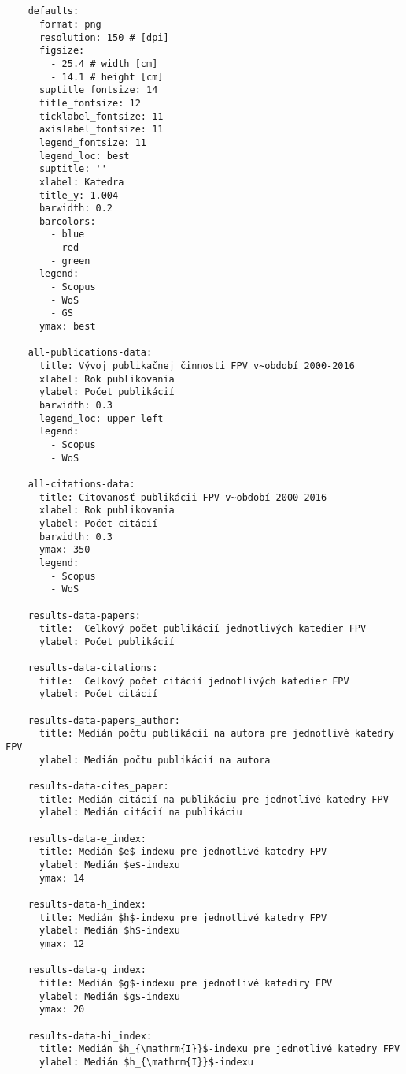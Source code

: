 \begin{source}
  \begin{verbatim}


    defaults:
      format: png
      resolution: 150 # [dpi]
      figsize:
        - 25.4 # width [cm]
        - 14.1 # height [cm]
      suptitle_fontsize: 14
      title_fontsize: 12
      ticklabel_fontsize: 11
      axislabel_fontsize: 11
      legend_fontsize: 11
      legend_loc: best
      suptitle: ''
      xlabel: Katedra
      title_y: 1.004
      barwidth: 0.2
      barcolors:
        - blue
        - red
        - green
      legend:
        - Scopus
        - WoS
        - GS
      ymax: best

    all-publications-data:
      title: Vývoj publikačnej činnosti FPV v~období 2000-2016
      xlabel: Rok publikovania
      ylabel: Počet publikácií
      barwidth: 0.3
      legend_loc: upper left
      legend:
        - Scopus
        - WoS

    all-citations-data:
      title: Citovanosť publikácii FPV v~období 2000-2016
      xlabel: Rok publikovania
      ylabel: Počet citácií
      barwidth: 0.3
      ymax: 350
      legend:
        - Scopus
        - WoS

    results-data-papers:
      title:  Celkový počet publikácií jednotlivých katedier FPV
      ylabel: Počet publikácií

    results-data-citations:
      title:  Celkový počet citácií jednotlivých katedier FPV
      ylabel: Počet citácií

    results-data-papers_author:
      title: Medián počtu publikácií na autora pre jednotlivé katedry FPV
      ylabel: Medián počtu publikácií na autora

    results-data-cites_paper:
      title: Medián citácií na publikáciu pre jednotlivé katedry FPV
      ylabel: Medián citácií na publikáciu

    results-data-e_index:
      title: Medián $e$-indexu pre jednotlivé katedry FPV
      ylabel: Medián $e$-indexu
      ymax: 14

    results-data-h_index:
      title: Medián $h$-indexu pre jednotlivé katedry FPV
      ylabel: Medián $h$-indexu
      ymax: 12

    results-data-g_index:
      title: Medián $g$-indexu pre jednotlivé katediry FPV
      ylabel: Medián $g$-indexu
      ymax: 20

    results-data-hi_index:
      title: Medián $h_{\mathrm{I}}$-indexu pre jednotlivé katedry FPV
      ylabel: Medián $h_{\mathrm{I}}$-indexu


\end{verbatim}
\end{source}
